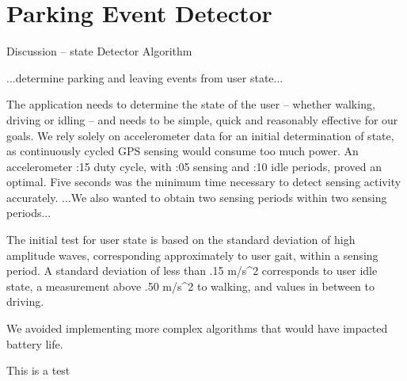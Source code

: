 \section{Parking Event Detector}
\label{sec-detector}

Discussion -- state Detector Algorithm

...determine parking and leaving events from user state...

The application needs to determine the state of the user -- whether walking, driving or idling – and needs to be simple, quick and reasonably effective for our goals.  We rely solely on accelerometer data for an initial determination of state, as continuously cycled GPS sensing would consume too much power.  An accelerometer :15 duty cycle, with :05 sensing and :10 idle periods, proved an optimal.  Five seconds was  the minimum time necessary to detect sensing activity accurately.  
...We also wanted to obtain two sensing periods within two sensing periods...

The initial test for user state is based on the standard deviation of high amplitude waves, corresponding approximately to user gait, within a sensing period.  A standard deviation of less than .15 m/s^2 corresponds to user idle state, a measurement above .50 m/s^2 to walking, and values in between to driving.


We avoided implementing more complex algorithms that would have impacted battery life.



This is a test  


